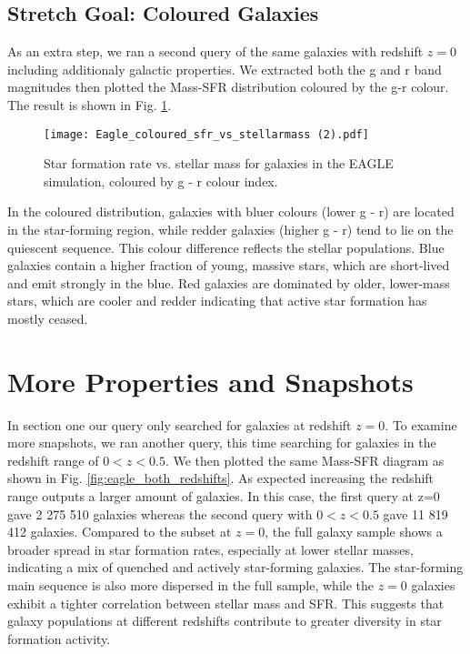 \documentclass[10pt]{article}
\begin{document}
\subsection{Stretch Goal: Coloured Galaxies}
As an extra step, we ran a second query of the same galaxies with redshift $z=0$ including additionaly galactic properties. We extracted both the g and r band magnitudes then plotted the Mass-SFR distribution  coloured by the g-r colour. The result is shown in Fig. \ref{fig:coloured}. 




\begin{figure}[H]
    \centering
    \texttt{[image: Eagle\_coloured\_sfr\_vs\_stellarmass (2).pdf]}
    \caption{Star formation rate vs. stellar mass for galaxies in the EAGLE simulation, coloured by g - r colour index.}
    \label{fig:coloured}
\end{figure}

In the coloured distribution, galaxies with bluer colours (lower g - r) are located in the star-forming region, while redder galaxies (higher g - r) tend to lie on the quiescent sequence. This colour difference reflects the stellar populations. Blue galaxies contain a higher fraction of young, massive stars, which are short-lived and emit strongly in the blue. Red galaxies are dominated by older, lower-mass stars, which are cooler and redder indicating that active star formation has mostly ceased.

\section{More Properties and Snapshots}
In section one our query only searched for galaxies at redshift $z=0$. To examine more snapshots, we ran another query, this time searching for galaxies in the redshift range of
$0<z<0.5$. We then plotted the same Mass-SFR diagram as shown in Fig. \ref{fig:eagle_both_redshifts}. As expected increasing the redshift range outputs a larger amount of galaxies. In this case, the first query at z=0 gave 2 275 510 galaxies whereas the second query with $0<z<0.5$ gave 11 819 412 galaxies. Compared to the subset at  $z = 0$, the full galaxy sample shows a broader spread in star formation rates, especially at lower stellar masses, indicating a mix of quenched and actively star-forming galaxies. The star-forming main sequence is also more dispersed in the full sample, while the $z = 0$ galaxies exhibit a tighter correlation between stellar mass and SFR. This suggests that galaxy populations at different redshifts contribute to greater diversity in star formation activity.
\end{document}
